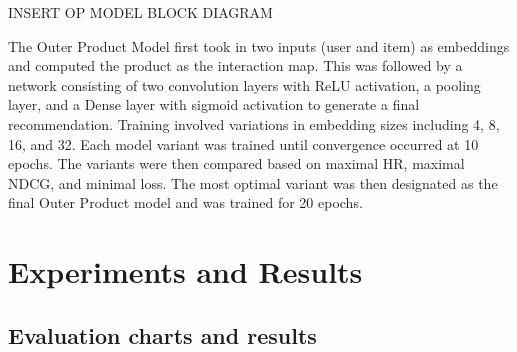 \documentclass{article}
\begin{document}
INSERT OP MODEL BLOCK DIAGRAM

The Outer Product Model first took in two inputs (user and item) as embeddings and computed the product as the interaction map. This was followed by a network consisting of two convolution layers with ReLU activation, a pooling layer, and a Dense layer with sigmoid activation to generate a final recommendation. Training involved variations in embedding sizes including 4, 8, 16, and 32. Each model variant was trained until convergence occurred at 10 epochs. The variants were then compared based on maximal HR, maximal NDCG, and minimal loss. The most optimal variant was then designated as the final Outer Product model and was trained for 20 epochs. \\

\section{Experiments and Results}
\subsection{Evaluation charts and results}
\end{document}
